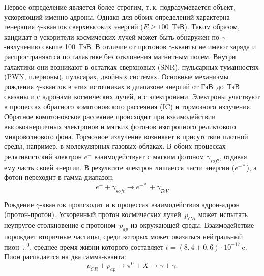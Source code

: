 \documentclass[magd,floatypics,numeref]{msudipl} %
\begin{document}
Первое определение является более строгим, т.\,к. подразумевается объект, ускоряющий именно адроны. Однако для обоих определений характерна генерация $\gamma$-квантов сверхвысоких энергий ($E\geq100$~ТэВ). Таким образом, кандидат в ускорители космических лучей может быть обнаружен по $\gamma$-излучению свыше 100~ТэВ.
В отличие от протонов $\gamma$-кванты не имеют заряда и распространяются по галактике без отклонения магнитным полем. Внутри галактики они возникают в остатках сверхновых (SNR), пульсарных туманностях (PWN, плерионы), пульсарах, двойных системах. 
Основные механизмы рождения $\gamma$-квантов в этих источниках в диапазоне энергий от ГэВ~до~ТэВ связаны и с адронами космических лучей, и с электронами. Электроны участвуют в процессах обратного комптоновского рассеяния (IC) и тормозного излучения. Обратное комптоновское рассеяние происходит при взаимодействии высокоэнергичных электронов и мягких фотонов изотропного реликтового микроволнового фона. Тормозное излучение возникает в присутствии плотной среды, например, в молекулярных газовых облаках. В обоих процессах релятивистский электрон $e^-$ взаимодействует с мягким фотоном $\gamma_{soft}$, отдавая ему часть своей энергии. В результате электрон лишается части энергии ($e^{-*}$), а фотон переходит в гамма-диапазон:
\begin{equation}
e^- + \gamma_{soft} \rightarrow e^{-*} + \gamma_{TeV}
\end{equation}

Рождение $\gamma$-квантов происходит и в процессах взаимодействия адрон-адрон (протон-протон). Ускоренный протон космических лучей~$p_{CR}$ может испытать неупругое столкновение с протоном~$p_{ap}$ из окружающей среды. Взаимодействие порождает вторичные частицы, среди которых может оказаться нейтральный пион~$\pi^0$, среднее время жизни которого составляет $t=(8,4\pm0,6)\cdot10^{-17}~$c. Пион распадается на два гамма-кванта:
\begin{equation}
p_{CR}+p_{ap}\rightarrow\pi^0+X\rightarrow \gamma+\gamma.
\end{equation}
\end{document}
